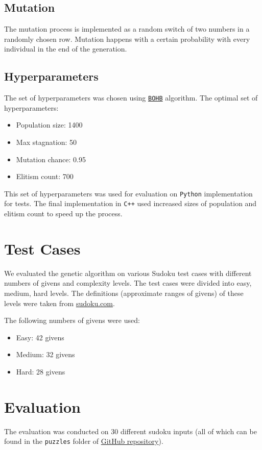 \documentclass[12pt]{article}
\begin{document}
\subsection{Mutation}
The mutation process is implemented as a random
switch of two numbers in a randomly chosen row.
Mutation happens with a certain probability with every
individual in the end of the generation.

\subsection{Hyperparameters}
The set of hyperparameters was chosen using
\href{https://arxiv.org/abs/1807.01774}{\texttt{BOHB}}
algorithm. The optimal set of hyperparameters:
\begin{itemize}
	\item Population size: 1400
	\item Max stagnation: 50
	\item Mutation chance: 0.95
	\item Elitism count: 700
\end{itemize}

This set of hyperparameters was used for evaluation on
\texttt{Python} implementation for tests. The final
implementation in \texttt{C++} used increased sizes of
population and elitism count to speed up the process.

\section{Test Cases}
We evaluated the genetic algorithm on various
Sudoku test cases with different numbers of
givens and complexity levels. The test cases
were divided into easy, medium, hard levels.
The definitions (approximate ranges of givens) 
of these levels were taken
from \href{https://www.sudoku.com}{sudoku.com}.

The following numbers of givens were used:
\begin{itemize}
	\item Easy: 42 givens
	\item Medium: 32 givens
	\item Hard: 28 givens
\end{itemize}

\section{Evaluation}
The evaluation was conducted on 30 different sudoku inputs
(all of which can be found in the \texttt{puzzles} folder
of \href{https://github.com/V1adych/itai-genetic-sudoku-solver}{GitHub repository}).
\end{document}
